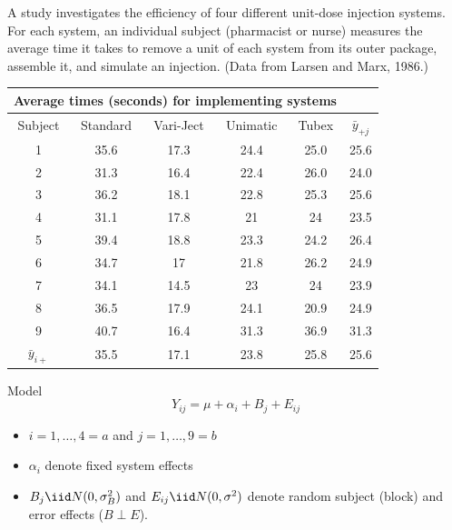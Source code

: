 \noindent
A study investigates the efficiency of four different
unit-dose injection systems.  For each
system, an individual subject (pharmacist or nurse) measures the
average time it takes to remove a unit of each system from its outer 
package, assemble it, and simulate an injection.  
(Data from Larsen and Marx, 1986.)\\
\begin{center}
\begin{tabular}{c|c c c c|c} 
\multicolumn{5}{c}{Average times (seconds) for implementing systems}\\ \hline
Subject & Standard & Vari-Ject & Unimatic & Tubex & $\bar{y}_{+j}$\\ \hline
1 & 35.6 & 17.3 & 24.4 & 25.0 & 25.6\\
2 & 31.3 & 16.4 & 22.4 & 26.0 & 24.0\\
3 & 36.2 & 18.1 & 22.8 & 25.3 & 25.6\\
4 & 31.1 & 17.8 & 21 & 24 & 23.5\\
5 & 39.4 & 18.8 & 23.3 & 24.2 & 26.4\\
6 & 34.7 & 17 & 21.8 & 26.2 & 24.9\\
7 & 34.1 & 14.5 & 23 & 24 & 23.9\\
8 & 36.5 & 17.9 & 24.1 & 20.9 & 24.9 \\
9 & 40.7 & 16.4 & 31.3 & 36.9 & 31.3 \\ \hline
$\bar{y}_{i+}$ & 35.5 & 17.1 & 23.8 & 25.8 & 25.6\\ \hline
\end{tabular}
\end{center}
Model
$$Y_{ij} = \mu + \alpha_i + B_j + E_{ij}$$
\begin{itemize}
\item $i=1,\ldots,4=a$ and $j=1,\ldots,9=b$ 
\item $\alpha_i$ denote fixed system effects
\item $B_j \iid N(0,\sigma_B^2)$ and $E_{ij} \iid N(0,\sigma^2)$
denote random subject (block) and error effects ($B \perp E$).
\end{itemize}
\newpage
